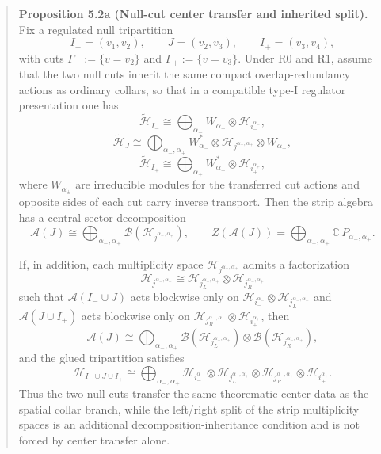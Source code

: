 \begin{quote}
\textbf{Proposition 5.2a (Null-cut center transfer and inherited split).} Fix a regulated null tripartition
\[
I_-=(v_1,v_2),\qquad
J=(v_2,v_3),\qquad
I_+=(v_3,v_4),
\]
with cuts \(\Gamma_-:=\{v=v_2\}\) and \(\Gamma_+:=\{v=v_3\}\). Under R0 and R1, assume that the two null cuts inherit the same compact overlap-redundancy actions as ordinary collars, so that in a compatible type-I regulator presentation one has
\[
\tilde{\mathcal H}_{I_-}
\cong
\bigoplus_{\alpha_-}
W_{\alpha_-}\otimes \mathcal H_{i_-^{\alpha_-}},
\]
\[
\tilde{\mathcal H}_{J}
\cong
\bigoplus_{\alpha_-,\alpha_+}
W_{\alpha_-}^{*}\otimes
\mathcal H_{j^{\alpha_-,\alpha_+}}\otimes
W_{\alpha_+},
\]
\[
\tilde{\mathcal H}_{I_+}
\cong
\bigoplus_{\alpha_+}
W_{\alpha_+}^{*}\otimes \mathcal H_{i_+^{\alpha_+}},
\]
where \(W_{\alpha_\pm}\) are irreducible modules for the transferred cut actions and opposite sides of each cut carry inverse transport. Then the strip algebra has a central sector decomposition
\[
\mathcal A(J)
\cong
\bigoplus_{\alpha_-,\alpha_+}
\mathcal B(\mathcal H_{j^{\alpha_-,\alpha_+}}),
\qquad
Z(\mathcal A(J))
=
\bigoplus_{\alpha_-,\alpha_+}\mathbb C\,P_{\alpha_-,\alpha_+}.
\]

If, in addition, each multiplicity space \(\mathcal H_{j^{\alpha_-,\alpha_+}}\) admits a factorization
\[
\mathcal H_{j^{\alpha_-,\alpha_+}}
\cong
\mathcal H_{j_L^{\alpha_-,\alpha_+}}
\otimes
\mathcal H_{j_R^{\alpha_-,\alpha_+}}
\]
such that \(\mathcal A(I_-\cup J)\) acts blockwise only on
\(\mathcal H_{i_-^{\alpha_-}}\otimes \mathcal H_{j_L^{\alpha_-,\alpha_+}}\)
and \(\mathcal A(J\cup I_+)\) acts blockwise only on
\(\mathcal H_{j_R^{\alpha_-,\alpha_+}}\otimes \mathcal H_{i_+^{\alpha_+}}\),
then
\[
\mathcal A(J)
\cong
\bigoplus_{\alpha_-,\alpha_+}
\mathcal B(\mathcal H_{j_L^{\alpha_-,\alpha_+}})
\otimes
\mathcal B(\mathcal H_{j_R^{\alpha_-,\alpha_+}}),
\]
and the glued tripartition satisfies
\[
\mathcal H_{I_-\cup J\cup I_+}
\cong
\bigoplus_{\alpha_-,\alpha_+}
\mathcal H_{i_-^{\alpha_-}}
\otimes
\mathcal H_{j_L^{\alpha_-,\alpha_+}}
\otimes
\mathcal H_{j_R^{\alpha_-,\alpha_+}}
\otimes
\mathcal H_{i_+^{\alpha_+}}.
\]
Thus the two null cuts transfer the same theorematic center data as the spatial collar branch, while the left/right split of the strip multiplicity spaces is an additional decomposition-inheritance condition and is not forced by center transfer alone.


\end{quote}
